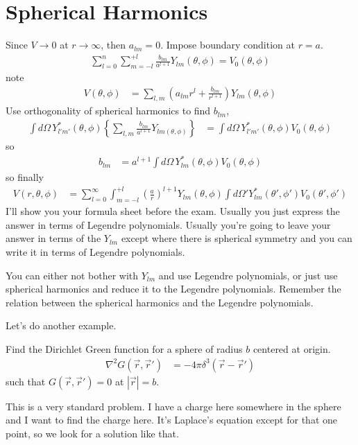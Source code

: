 \section{Spherical Harmonics}
Since $V\to 0$ at $r\to\infty$, then $a_{lm}=0$.
Impose boundary condition at $r=a$.
\begin{align}
    \sum_{l=0}^{n}\sum_{m=-l}^{+l}
    \frac{b_{lm}}{a^{l + 1}} Y_{lm}\left( \theta, \phi \right)
    =
    V_0 \left( \theta, \phi \right)
\end{align}
note
\begin{align}
    V\left( \theta, \phi \right)
    &=
    \sum_{l,m}
    \left( a_{lm}
    r^l
    +
    \frac{b_{lm}}{r^{l + 1}}\right)
    Y_{lm}\left( \theta, \phi \right)
\end{align}
Use orthogonality of spherical harmonics to find $b_{lm}$,
\begin{align}
    \int d\Omega \, Y_{l'm'}^* \left( \theta,\phi \right)
    \left\{ 
    \sum_{l,m}
    \frac{b_{lm}}{a^{l + 1}}
    Y_{lm\left( \theta, \phi \right)}
    \right\}
    &=
    \int d\Omega\,
    Y_{l'm'}^*\left( \theta, \phi \right)
    V_0\left( \theta, \phi \right)
\end{align}
so
\begin{align}
    b_{lm}
    &=
    a^{l + 1}
    \int d\Omega\,
    Y_{lm}^*\left( \theta, \phi \right)
    V_0\left( \theta, \phi \right)
\end{align}
so finally
\begin{align}
    V\left( r, \theta, \phi \right)
    &=
    \sum_{l=0}^{\infty}
    \int_{m=-l}^{+l}
    \left( \frac{a}{r} \right)^{l + 1}
    Y_{lm}\left( \theta, \phi \right)
    \int d\Omega'
    Y_{lm}^*\left( \theta', \phi' \right)
    V_0\left( \theta', \phi' \right)
\end{align}
I'll show you your formula sheet before the exam.
Usually you just express the answer in terms of Legendre polynomials.
Usually you're going to leave your answer in terms of the $Y_{lm}$ except where
there is spherical symmetry and you can write it in terms of Legendre
polynomials.

You can either not bother with $Y_{lm}$ and use Legendre polynomials,
or just use spherical harmonics and reduce it to the Legendre polynomials.
Remember the relation between the spherical harmonics and the Legendre
polynomials.

Let's do another example.
\begin{example}
    Find the Dirichlet Green function for a sphere of radius $b$ centered at
    origin.
    \begin{align}
        \nabla^2 G\left( \vec{r}, \vec{r}' \right)
        &=
        -4\pi \delta^{3}\left( \vec{r} - \vec{r}' \right)
    \end{align}
    such that $G\left( \vec{r}, \vec{r}' \right) = 0$
    at $\left|\vec{r}\right| = b$.
\end{example}
This is a very standard problem.
I have a charge here somewhere in the sphere and I want to find the charge here.
It's Laplace's equation except for that one point,
so we look for a solution like that.

